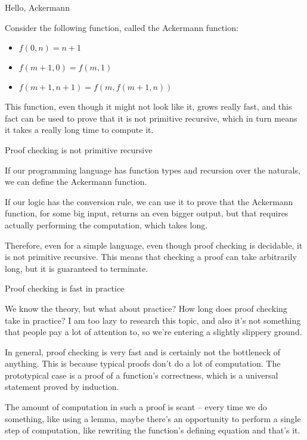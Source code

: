 \documentclass{beamer}
\begin{document}
\begin{frame}{Hello, Ackermann}

Consider the following function, called the Ackermann function:

\begin{itemize}
  \item $f(0, n) = n + 1$
  \item $f(m + 1, 0) = f(m, 1)$
  \item $f(m + 1, n + 1) = f(m, f(m + 1, n))$
\end{itemize}

\vspace{2em}

This function, even though it might not look like it, grows really fast, and this fact can be used to prove that it is not primitive recursive, which in turn means it takes a really long time to compute it.

\end{frame}

\begin{frame}{Proof checking is not primitive recursive}

If our programming language has function types and recursion over the naturals, we can define the Ackermann function.

\vspace{2em}

If our logic has the conversion rule, we can use it to prove that the Ackermann function, for some big input, returns an even bigger output, but that requires actually performing the computation, which takes long.

\vspace{2em}

Therefore, even for a simple language, even though proof checking is decidable, it is not primitive recursive. This means that checking a proof can take arbitrarily long, but it is guaranteed to terminate.

\end{frame}

\begin{frame}{Proof checking is fast in practice}

We know the theory, but what about practice? How long does proof checking take in practice? I am too lazy to research this topic, and also it's not something that people pay a lot of attention to, so we're entering a slightly slippery ground.

\vspace{1em}

In general, proof checking is very fast and is certainly  not the bottleneck of anything. This is because typical proofs don't do a lot of computation. The prototypical case is a proof of a function's correctness, which is a universal statement proved by induction.

\vspace{1em}

The amount of computation in such a proof is scant -- every time we do something, like using a lemma, maybe there's an opportunity to perform a single step of computation, like rewriting the function's defining equation and that's it.

\end{frame}
\end{document}

